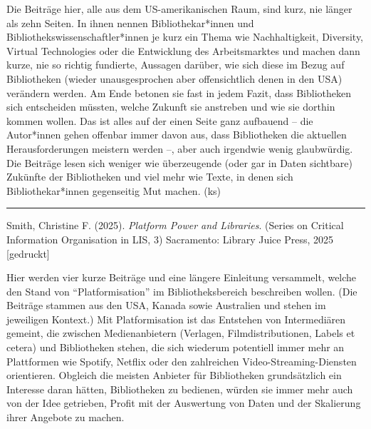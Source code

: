 \documentclass[a4paper,
fontsize=11pt,
oneside,
numbers=noperiodatend,
parskip=half-,
bibliography=totoc,
final
]{scrartcl}
\begin{document}
Die Beiträge hier, alle aus dem US-amerikanischen Raum, sind kurz, nie
länger als zehn Seiten. In ihnen nennen Bibliothekar*innen und
Bibliothekswissenschaftler*innen je kurz ein Thema wie Nachhaltigkeit,
Diversity, Virtual Technologies oder die Entwicklung des Arbeitsmarktes
und machen dann kurze, nie so richtig fundierte, Aussagen darüber, wie
sich diese im Bezug auf Bibliotheken (wieder unausgesprochen aber
offensichtlich denen in den USA) verändern werden. Am Ende betonen sie
fast in jedem Fazit, dass Bibliotheken sich entscheiden müssten, welche
Zukunft sie anstreben und wie sie dorthin kommen wollen. Das ist alles
auf der einen Seite ganz aufbauend -- die Autor*innen gehen offenbar
immer davon aus, dass Bibliotheken die aktuellen Herausforderungen
meistern werden --, aber auch irgendwie wenig glaubwürdig. Die Beiträge
lesen sich weniger wie überzeugende (oder gar in Daten sichtbare)
Zukünfte der Bibliotheken und viel mehr wie Texte, in denen sich
Bibliothekar*innen gegenseitig Mut machen. (ks)

\begin{center}\rule{0.5\linewidth}{0.5pt}\end{center}

Smith, Christine F. (2025). \emph{Platform Power and Libraries}. (Series
on Critical Information Organisation in LIS, 3) Sacramento: Library
Juice Press, 2025 {[}gedruckt{]}

Hier werden vier kurze Beiträge und eine längere Einleitung versammelt,
welche den Stand von \enquote{Platformisation} im Bibliotheksbereich
beschreiben wollen. (Die Beiträge stammen aus den USA, Kanada sowie
Australien und stehen im jeweiligen Kontext.) Mit Platformisation ist
das Entstehen von Intermediären gemeint, die zwischen Medienanbietern
(Verlagen, Filmdistributionen, Labels et cetera) und Bibliotheken
stehen, die sich wiederum potentiell immer mehr an Plattformen wie
Spotify, Netflix oder den zahlreichen Video-Streaming-Diensten
orientieren. Obgleich die meisten Anbieter für Bibliotheken
grundsätzlich ein Interesse daran hätten, Bibliotheken zu bedienen,
würden sie immer mehr auch von der Idee getrieben, Profit mit der
Auswertung von Daten und der Skalierung ihrer Angebote zu machen.
\end{document}
